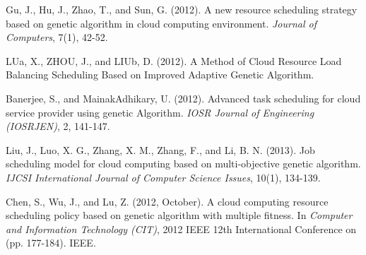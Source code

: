\documentclass[10pt,twoside,openright,logo]{report}
\begin{document}
\begin{thebibliography}{99}
 Gu, J., Hu, J., Zhao, T., and Sun, G. (2012).
\newblock A new resource scheduling strategy based on genetic algorithm in cloud computing environment.
\newblock \emph{Journal of Computers}, 7(1), 42-52.

 LUa, X., ZHOU, J., and LIUb, D. (2012).
\newblock A Method of Cloud Resource Load Balancing Scheduling Based on Improved Adaptive Genetic Algorithm.

 Banerjee, S., and MainakAdhikary, U. (2012).
\newblock Advanced task scheduling for cloud service provider using genetic Algorithm.
\newblock \emph{IOSR Journal of Engineering (IOSRJEN)}, 2, 141-147.

 Liu, J., Luo, X. G., Zhang, X. M., Zhang, F., and Li, B. N. (2013).
\newblock Job scheduling model for cloud computing based on multi-objective genetic algorithm.
\newblock \emph{IJCSI International Journal of Computer Science Issues}, 10(1), 134-139.

 Chen, S., Wu, J., and Lu, Z. (2012, October).
\newblock A cloud computing resource scheduling policy based on genetic algorithm with multiple fitness.
\newblock In \emph{Computer and Information Technology (CIT)}, 2012 IEEE 12th International Conference on (pp. 177-184). IEEE.

\end{thebibliography}

\end{document}

